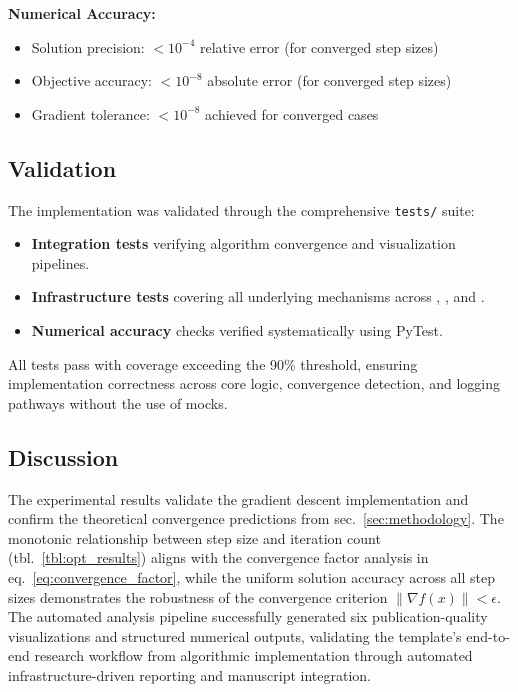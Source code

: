 \documentclass[
]{article}
\providecommand{\tightlist}{%
  \setlength{\itemsep}{0pt}\setlength{\parskip}{0pt}}
\begin{document}
\textbf{Numerical Accuracy:}

\begin{itemize}
\tightlist
\item
  Solution precision: \(< 10^{-4}\) relative error (for converged step
  sizes)
\item
  Objective accuracy: \(< 10^{-8}\) absolute error (for converged step
  sizes)
\item
  Gradient tolerance: \(< 10^{-8}\) achieved for converged cases
\end{itemize}

\subsection{Validation}\label{validation}

The implementation was validated through the comprehensive
\texttt{tests/} suite:

\begin{itemize}
\tightlist
\item
  \textbf{Integration tests} verifying algorithm convergence and
  visualization pipelines.
\item
  \textbf{Infrastructure tests} covering all underlying mechanisms
  across ,
  , and
  .
\item
  \textbf{Numerical accuracy} checks verified systematically using
  PyTest.
\end{itemize}

All tests pass with coverage exceeding the 90\% threshold, ensuring
implementation correctness across core logic, convergence detection, and
logging pathways without the use of mocks.

\subsection{Discussion}\label{discussion}

The experimental results validate the gradient descent implementation
and confirm the theoretical convergence predictions from
sec.~\ref{sec:methodology}. The monotonic relationship between step size
and iteration count (tbl.~\ref{tbl:opt_results}) aligns with the
convergence factor analysis in eq.~\ref{eq:convergence_factor}, while
the uniform solution accuracy across all step sizes demonstrates the
robustness of the convergence criterion \(\|\nabla f(x)\| < \epsilon\).
The automated analysis pipeline successfully generated six
publication-quality visualizations and structured numerical outputs,
validating the template's end-to-end research workflow from algorithmic
implementation through automated infrastructure-driven reporting and
manuscript integration.
\end{document}
